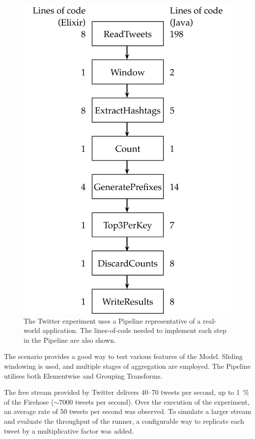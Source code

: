 \begin{figure}
	\centering
	\includegraphics[height=0.6\textheight]{images/diags/eval-twitter-pipeline}
	\caption[The Twitter Pipeline as a Directed Acyclic Graph.]{The Twitter experiment uses a Pipeline representative of a real-world application. The lines-of-code needed to implement each step in the Pipeline are also shown.}
	\label{fig:eval:twitter-pipeline-dag}
\end{figure}


The scenario provides a good way to test various features of the Model.
Sliding windowing is used, and multiple stages of aggregation are employed.
The Pipeline utilises both Elementwise and Grouping Transforms.

The free stream provided by Twitter delivers \num{40}--\num{70} tweets per second, up to \SI{1}{\percent} of the Firehose ($\sim$\num{7000} tweets per second).
Over the execution of the experiment, an average rate of \num{50} tweets per second was observed.
To simulate a larger stream and evaluate the throughput of the runner, a configurable way to replicate each tweet by a multiplicative factor was added.

